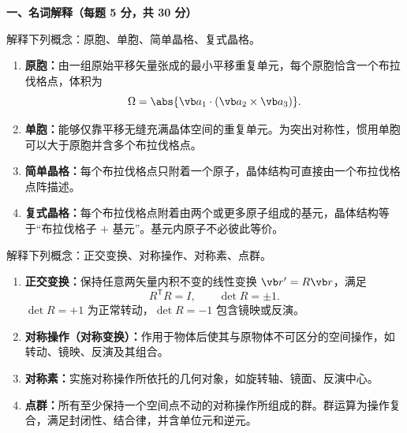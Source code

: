 
\textbf{一、名词解释（每题 5 分，共 30 分）}

\begin{question}[5 分]
解释下列概念：原胞、单胞、简单晶格、复式晶格。


\begin{solution}
\begin{enumerate}
  \item \textbf{原胞：}由一组原始平移矢量张成的最小平移重复单元，每个原胞恰含一个布拉伐格点，体积为
  \[
    \Omega=\abs{\vb a_1\cdot(\vb a_2\times\vb a_3)}.
  \]
  \item \textbf{单胞：}能够仅靠平移无缝充满晶体空间的重复单元。为突出对称性，惯用单胞可以大于原胞并含多个布拉伐格点。
  \item \textbf{简单晶格：}每个布拉伐格点只附着一个原子，晶体结构可直接由一个布拉伐格点阵描述。
  \item \textbf{复式晶格：}每个布拉伐格点附着由两个或更多原子组成的基元，晶体结构等于“布拉伐格子 $+$ 基元”。基元内原子不必彼此等价。
\end{enumerate}
\end{solution}
\end{question}

\begin{question}[5 分]
解释下列概念：正交变换、对称操作、对称素、点群。


\begin{solution}
\begin{enumerate}
  \item \textbf{正交变换：}保持任意两矢量内积不变的线性变换 $\vb r'=R\vb r$，满足
  \[
    R^{\mathsf T}R=I,\qquad \det R=\pm1.
  \]
  $\det R=+1$ 为正常转动，$\det R=-1$ 包含镜映或反演。
  \item \textbf{对称操作（对称变换）：}作用于物体后使其与原物体不可区分的空间操作，如转动、镜映、反演及其组合。
  \item \textbf{对称素：}实施对称操作所依托的几何对象，如旋转轴、镜面、反演中心。
  \item \textbf{点群：}所有至少保持一个空间点不动的对称操作所组成的群。群运算为操作复合，满足封闭性、结合律，并含单位元和逆元。
\end{enumerate}
\end{solution}
\end{question}

